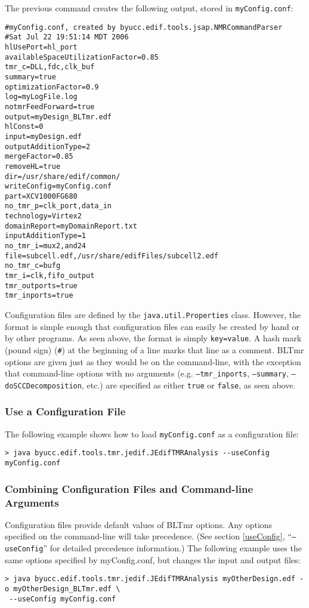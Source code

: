 The previous command creates the following output, stored in 
\texttt{myConfig.conf}:

\begin{verbatim}
#myConfig.conf, created by byucc.edif.tools.jsap.NMRCommandParser
#Sat Jul 22 19:51:14 MDT 2006
hlUsePort=hl_port
availableSpaceUtilizationFactor=0.85
tmr_c=DLL,fdc,clk_buf
summary=true
optimizationFactor=0.9
log=myLogFile.log
notmrFeedForward=true
output=myDesign_BLTmr.edf
hlConst=0
input=myDesign.edf
outputAdditionType=2
mergeFactor=0.85
removeHL=true
dir=/usr/share/edif/common/
writeConfig=myConfig.conf
part=XCV1000FG680
no_tmr_p=clk_port,data_in
technology=Virtex2
domainReport=myDomainReport.txt
inputAdditionType=1
no_tmr_i=mux2,and24
file=subcell.edf,/usr/share/edifFiles/subcell2.edf
no_tmr_c=bufg
tmr_i=clk,fifo_output
tmr_outports=true
tmr_inports=true
\end{verbatim}

Configuration files are defined by the \texttt{java.util.Properties} class. 
However, the format is simple enough that configuration files can easily be 
created by hand or by other programs. As seen above, the format is simply 
\texttt{key=value}. A hash mark (pound sign) (\texttt{\#}) at the beginning of 
a line marks that line as a comment. BLTmr options are given just as they would 
be on the command-line, with the exception that command-line options with no 
arguments (e.g. \texttt{--tmr\_inports}, \texttt{--summary}, 
\texttt{--doSCCDecomposition}, etc.) are specified as either \texttt{true} or 
\texttt{false}, as seen above.

\subsubsection{Use a Configuration File}

The following example shows how to load \texttt{myConfig.conf} as a configuration
file:

\begin{verbatim}
> java byucc.edif.tools.tmr.jedif.JEdifTMRAnalysis --useConfig myConfig.conf
\end{verbatim}

\subsubsection{Combining Configuration Files and Command-line Arguments}
Configuration files provide default values of BLTmr options. Any options 
specified on the command-line will take precedence. (See section 
\ref{useConfig}, ``\texttt{--useConfig}'' for detailed precedence information.)
The following example uses the same options specified by myConfig.conf, but
changes the input and output files:

\begin{verbatim}
> java byucc.edif.tools.tmr.jedif.JEdifTMRAnalysis myOtherDesign.edf -o myOtherDesign_BLTmr.edf \
 --useConfig myConfig.conf
\end{verbatim}

